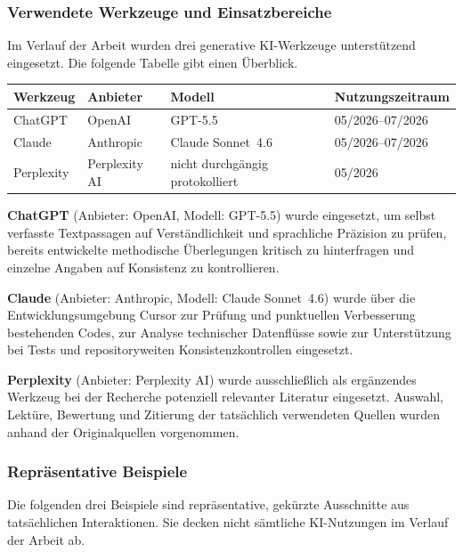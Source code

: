 \subsubsection*{Verwendete Werkzeuge und Einsatzbereiche}

Im Verlauf der Arbeit wurden drei generative KI-Werkzeuge
unterstützend eingesetzt. Die folgende Tabelle gibt einen Überblick.

\begin{center}
  \small
  \begin{tabular}{llll}
    \hline
    \textbf{Werkzeug} & \textbf{Anbieter} & \textbf{Modell} & \textbf{Nutzungszeitraum} \\
    \hline
    ChatGPT    & OpenAI        & GPT-5.5                         & 05/2026--07/2026 \\
    Claude     & Anthropic     & Claude Sonnet~4.6               & 05/2026--07/2026 \\
    Perplexity & Perplexity AI & nicht durchgängig protokolliert & 05/2026          \\
    \hline
  \end{tabular}
\end{center}

\textbf{ChatGPT} (Anbieter: OpenAI, Modell: GPT-5.5) wurde eingesetzt, um selbst
verfasste Textpassagen auf Verständlichkeit und sprachliche Präzision zu
prüfen, bereits ent\-wi\-ckel\-te methodische Überlegungen kritisch zu hinterfragen
und einzelne Angaben auf Konsistenz zu kontrollieren.

\textbf{Claude} (Anbieter: Anthropic, Modell: Claude Sonnet~4.6) wurde
über die Entwicklungsumgebung Cursor zur Prüfung und punktuellen Verbesserung
bestehenden Codes, zur Analyse technischer Datenflüsse sowie zur Unterstützung
bei Tests und repositoryweiten Konsistenzkontrollen eingesetzt.

\textbf{Perplexity} (Anbieter: Perplexity AI) wurde ausschließlich als
ergänzendes Werkzeug bei der Recherche potenziell relevanter Literatur
eingesetzt. Auswahl, Lektüre, Bewertung und Zitierung der tatsächlich
verwendeten Quellen wurden anhand der Originalquellen vorgenommen.

\subsubsection*{Repräsentative Beispiele}

Die folgenden drei Beispiele sind repräsentative, gekürzte Ausschnitte aus
tatsächlichen Interaktionen. Sie decken nicht sämtliche KI-Nutzungen im Verlauf
der Arbeit ab.

